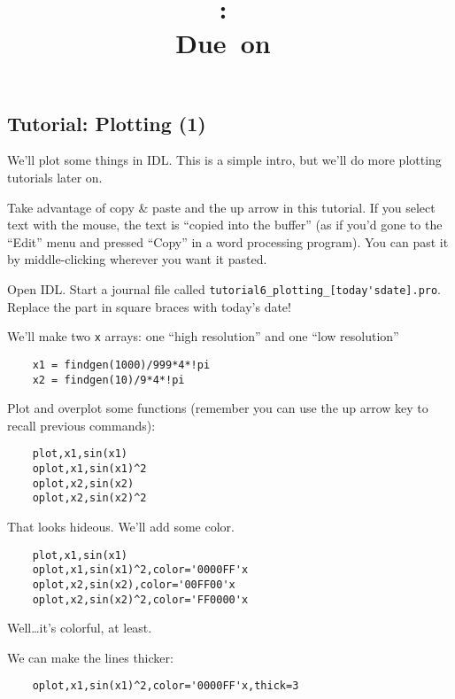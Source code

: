 \documentclass{article}
\title{\vspace{2in}\textmd{\textbf{\hmwkClass:\ \hmwkTitle}}\\\normalsize\vspace{0.1in}\small{Due\ on\ \hmwkDueDate}\\\vspace{0.1in}\large{}\vspace{3in}}
\date{}
\begin{document}
\begin{spacing}{1.0}
\newpage



\section{Tutorial: Plotting (1)}

We'll plot some things in IDL.  This is a simple intro, but we'll do
more plotting tutorials later on.

Take advantage of copy \& paste and the up arrow in this tutorial.  If you
select text with the mouse, the text is ``copied into the buffer'' (as if you'd
gone to the ``Edit'' menu and pressed ``Copy'' in a word processing program).
You can past it by middle-clicking wherever you want it pasted.

Open IDL.  Start a journal file called
\verb|tutorial6_plotting_[today'sdate].pro|.  Replace the part in square braces
with today's date!

We'll make two \verb|x| arrays: one ``high resolution'' and one ``low resolution''

\begin{lstlisting}
    x1 = findgen(1000)/999*4*!pi
    x2 = findgen(10)/9*4*!pi
\end{lstlisting}

Plot and overplot some functions (remember you can use the up arrow key to recall
previous commands):

\begin{lstlisting}
    plot,x1,sin(x1)
    oplot,x1,sin(x1)^2
    oplot,x2,sin(x2)
    oplot,x2,sin(x2)^2
\end{lstlisting}

That looks hideous.  We'll add some color.

\begin{lstlisting}
    plot,x1,sin(x1)
    oplot,x1,sin(x1)^2,color='0000FF'x
    oplot,x2,sin(x2),color='00FF00'x
    oplot,x2,sin(x2)^2,color='FF0000'x
\end{lstlisting}

Well\dots it's colorful, at least.

We can make the lines thicker:

\begin{lstlisting}
    oplot,x1,sin(x1)^2,color='0000FF'x,thick=3
\end{lstlisting}


\end{spacing}
\end{document}
